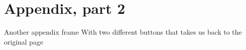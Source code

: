 \documentclass[aspectratio=169, 11pt]{beamer}
\begin{document}
\section{Appendix, part 2}

\begin{frame}[label=app_example]{Another appendix frame}
    With two different buttons that takes us back to the original page \quad \hyperlink{example_to_return_to1}{}\quad\hyperlink{example_to_return_to1}{}
\end{frame}
\end{document}
